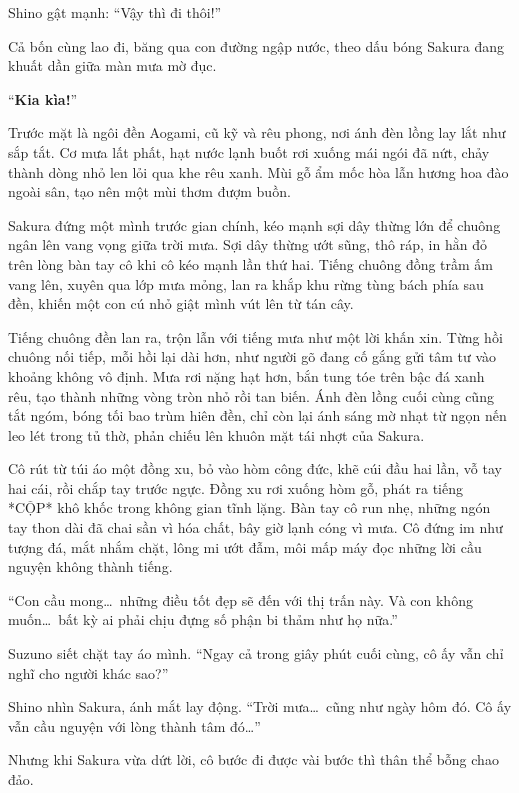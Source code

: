 \documentclass[../main.tex]{subfiles}
\begin{document}
Shino gật mạnh: ``Vậy thì đi thôi!''

Cả bốn cùng lao đi, băng qua con đường ngập nước, theo dấu bóng Sakura đang khuất dần giữa màn mưa mờ đục.

``\textbf{Kia kìa!}''

Trước mặt là ngôi đền Aogami, cũ kỹ và rêu phong, nơi ánh đèn lồng lay lắt như sắp tắt. Cơ mưa lất phất, hạt nước lạnh buốt rơi xuống mái ngói đã nứt, chảy thành dòng nhỏ len lỏi qua khe rêu xanh. Mùi gỗ ẩm mốc hòa lẫn hương hoa đào ngoài sân, tạo nên một mùi thơm đượm buồn.

Sakura đứng một mình trước gian chính, kéo mạnh sợi dây thừng lớn để chuông ngân lên vang vọng giữa trời mưa. Sợi dây thừng ướt sũng, thô ráp, in hằn đỏ trên lòng bàn tay cô khi cô kéo mạnh lần thứ hai. Tiếng chuông đồng trầm ấm vang lên, xuyên qua lớp mưa mỏng, lan ra khắp khu rừng tùng bách phía sau đền, khiến một con cú nhỏ giật mình vút lên từ tán cây.

Tiếng chuông đền lan ra, trộn lẫn với tiếng mưa như một lời khấn xin. Từng hồi chuông nối tiếp, mỗi hồi lại dài hơn, như người gõ đang cố gắng gửi tâm tư vào khoảng không vô định. Mưa rơi nặng hạt hơn, bắn tung tóe trên bậc đá xanh rêu, tạo thành những vòng tròn nhỏ rồi tan biến. Ánh đèn lồng cuối cùng cũng tắt ngóm, bóng tối bao trùm hiên đền, chỉ còn lại ánh sáng mờ nhạt từ ngọn nến leo lét trong tủ thờ, phản chiếu lên khuôn mặt tái nhợt của Sakura.

Cô rút từ túi áo một đồng xu, bỏ vào hòm công đức, khẽ cúi đầu hai lần, vỗ tay hai cái, rồi chắp tay trước ngực. Đồng xu rơi xuống hòm gỗ, phát ra tiếng *CỘP* khô khốc trong không gian tĩnh lặng. Bàn tay cô run nhẹ, những ngón tay thon dài đã chai sần vì hóa chất, bây giờ lạnh cóng vì mưa. Cô đứng im như tượng đá, mắt nhắm chặt, lông mi ướt đẫm, môi mấp máy đọc những lời cầu nguyện không thành tiếng.

``Con cầu mong\dots\ những điều tốt đẹp sẽ đến với thị trấn này. Và con không muốn\dots\ bất kỳ ai phải chịu đựng số phận bi thảm như họ nữa.''


Suzuno siết chặt tay áo mình. ``Ngay cả trong giây phút cuối cùng, cô ấy vẫn chỉ nghĩ cho người khác sao?''

Shino nhìn Sakura, ánh mắt lay động. ``Trời mưa\dots\ cũng như ngày hôm đó. Cô ấy vẫn cầu nguyện với lòng thành tâm đó\dots''

Nhưng khi Sakura vừa dứt lời, cô bước đi được vài bước thì thân thể bỗng chao đảo.
\end{document}
